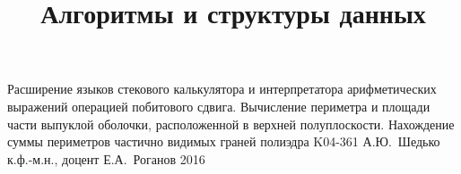\documentclass[a4paper,12pt]{memoir}
\def\+{\hskip 0.15mm}
\begin{document}
\renewcommand{\contentsname}{{\Large{Содержание}\hfill}}

\title{Алгоритмы и структуры данных}
{Расширение языков стекового калькулятора и интерпретатора арифметических
выражений операцией побитового сдвига.
Вычисление периметра и площади части выпуклой оболочки, расположенной в
верхней полуплоскости. Нахождение суммы периметров частично видимых граней полиэдра}
{K04-361}
{А.\+Ю.~Шедько}
{к.ф.-м.н., доцент}
{Е.\+А.~Роганов}
{2016}


%





\newpage

%
\end{document}
